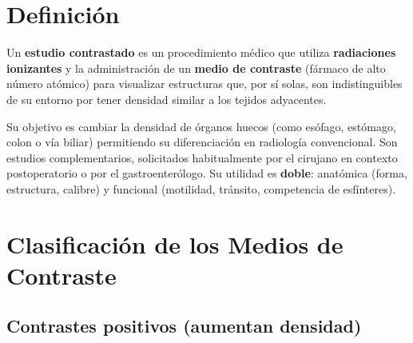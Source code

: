 \vspace{1em}

\section*{Definición}

\begin{cajadefinicion}
	Un \textbf{estudio contrastado} es un procedimiento médico que utiliza \textbf{radiaciones ionizantes} y la administración de un \textbf{medio de contraste} (fármaco de alto número atómico) para visualizar estructuras que, por sí solas, son indistinguibles de su entorno por tener densidad similar a los tejidos adyacentes.
\end{cajadefinicion}

Su objetivo es cambiar la densidad de órganos huecos (como esófago, estómago, colon o vía biliar) permitiendo su diferenciación en radiología convencional. Son estudios complementarios, solicitados habitualmente por el cirujano en contexto postoperatorio o por el gastroenterólogo. Su utilidad es \textbf{doble}: anatómica (forma, estructura, calibre) y funcional (motilidad, tránsito, competencia de esfínteres).

\section*{Clasificación de los Medios de Contraste}

\subsection*{Contrastes positivos (aumentan densidad)}


